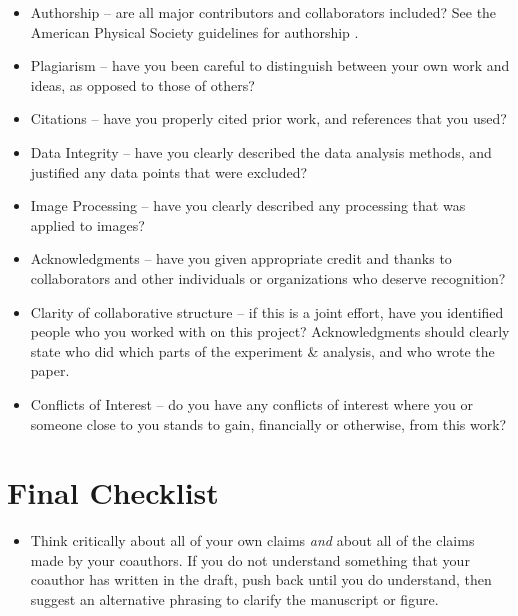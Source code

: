 \documentclass[aps,prb,twocolumn,superscriptaddress,floatfix,longbibliography]{revtex4-2}
\begin{document}
\begin{itemize}[label=$\Box$]
\item Authorship -- are all major contributors and collaborators included? See the American Physical Society guidelines for authorship \cite{APSauthor}.

\item Plagiarism -- have you been careful to distinguish between your own work and ideas, as opposed to those of others?

\item Citations -- have you properly cited prior work, and references that you used?

\item Data Integrity -- have you clearly described the data analysis methods, and justified any data points that were excluded?

\item Image Processing -- have you clearly described any processing that was applied to images?

\item Acknowledgments -- have you given appropriate credit and thanks to collaborators and other individuals or organizations who deserve recognition?

\item Clarity of collaborative structure -- if this is a joint effort, have you identified people who you worked with on this project? Acknowledgments should clearly state who did which parts of the experiment \& analysis, and who wrote the paper.

\item Conflicts of Interest -- do you have any conflicts of interest where you or someone close to you stands to gain, financially or otherwise, from this work?
\end{itemize}

\section{\label{sec:Conclusion}Final Checklist}

\begin{itemize}[label=$\Box$]
\item Think critically about all of your own claims {\em and} about all of the claims made by your coauthors. If you do not understand something that your coauthor has written in the draft, push back until you do understand, then suggest an alternative phrasing to clarify the manuscript or figure.
\end{itemize}
\end{document}
